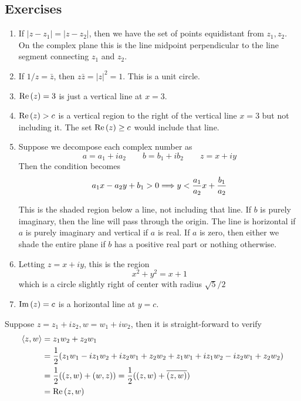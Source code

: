 \newpage 
\subsection{Exercises}

\begin{exercise} \hfill
	\begin{enumerate}[label=\alph*)]
		\item If $|z - z_1| = |z - z_2|$, then we have the set of points equidistant from $z_1, z_2$. On the complex plane this is the line midpoint perpendicular to the line segment connecting $z_1$ and $z_2$. 
		\item If $1/z = \bar z$, then $z\bar z = |z|^2 = 1$. This is a unit circle.
		\item $\Re\left(z\right) = 3$ is just a vertical line at $x = 3$.
		\item $\Re\left(z\right) > c$ is a vertical region to the right of the vertical line $x = 3$ but not including it. The set $\Re\left(z\right) \geq c$ would include that line.
		\item Suppose we decompose each complex number as
		\[ a = a_1 + i a_2 \qquad b = b_1 + i b_2 \qquad z = x + i y \]
		Then the condition becomes
		\[ a_1 x - a_2 y + b_1 > 0 \Longrightarrow y < \frac{a_1}{a_2} x + \frac{b_1}{a_2} \]
		
		This is the shaded region below a line, not including that line. If $b$ is purely imaginary, then the line will pass through the origin. The line is horizontal if $a$ is purely imaginary and vertical if $a$ is real. If $a$ is zero, then either we shade the entire plane if $b$ has a positive real part or nothing otherwise.
		\item Letting $z = x + iy$, this is the region
		\[ x^2 + y^2 = x + 1 \]
		which is a circle slightly right of center with radius $\sqrt{5}/2$
		\item $\Im\left(z\right) = c$ is a horizontal line at $y = c$.
	\end{enumerate}
\end{exercise}

\begin{exercise}
	Suppose $z = z_1 + iz_2, w = w_1 + iw_2$, then it is straight-forward to verify
	\begin{align*}
		\left\langle z,w \right\rangle &= z_1 w_2 + z_2 w_1 \\
		&= \frac{1}{2}( z_1w_1 - iz_1w_2 + iz_2w_1 + z_2w_2 + z_1w_1 + iz_1w_2 - iz_2w_1 + z_2w_2 ) \\
		&= \frac{1}{2}( (z,w) + (w,z) ) = \frac{1}{2}( (z,w) + \overline{(z,w)} ) \\
		&= \Re\left(z,w\right)
	\end{align*}
\end{exercise}

